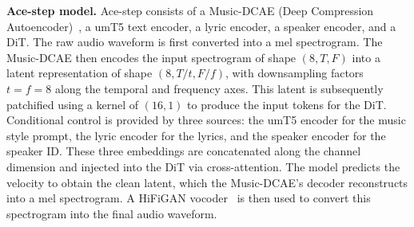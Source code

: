 
\textbf{Ace-step model.} Ace-step consists of a Music-DCAE (Deep Compression Autoencoder)~\cite{chen2024deep}, a umT5 text encoder, a lyric encoder, a speaker encoder, and a DiT. The raw audio waveform is first converted into a mel spectrogram. The Music-DCAE then encodes the input spectrogram of shape $(8, T, F)$ into a latent representation of shape $(8, T/t, F/f)$, with downsampling factors $t=f=8$ along the temporal and frequency axes. This latent is subsequently patchified using a kernel of $(16, 1)$ to produce the input tokens for the DiT. Conditional control is provided by three sources: the umT5 encoder for the music style prompt, the lyric encoder for the lyrics, and the speaker encoder for the speaker ID. These three embeddings are concatenated along the channel dimension and injected into the DiT via cross-attention. The model predicts the velocity to obtain the clean latent, which the Music-DCAE's decoder reconstructs into a mel spectrogram. A HiFiGAN vocoder~\cite{liao2024fish} is then used to convert this spectrogram into the final audio waveform.



